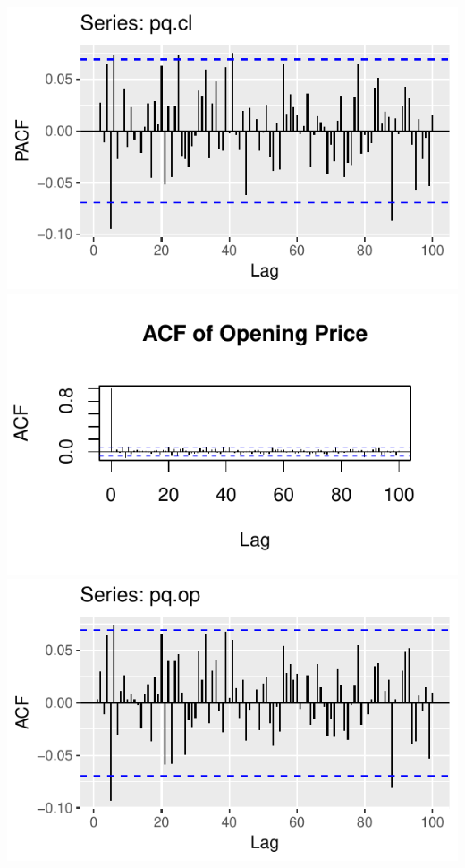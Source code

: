 \documentclass[]{tufte-book}
\begin{document}
\includegraphics{binary-forex-trading-Q1_files/figure-latex/acf-pacf-10}
\includegraphics{binary-forex-trading-Q1_files/figure-latex/acf-pacf-11}
\includegraphics{binary-forex-trading-Q1_files/figure-latex/acf-pacf-12}
\end{document}
